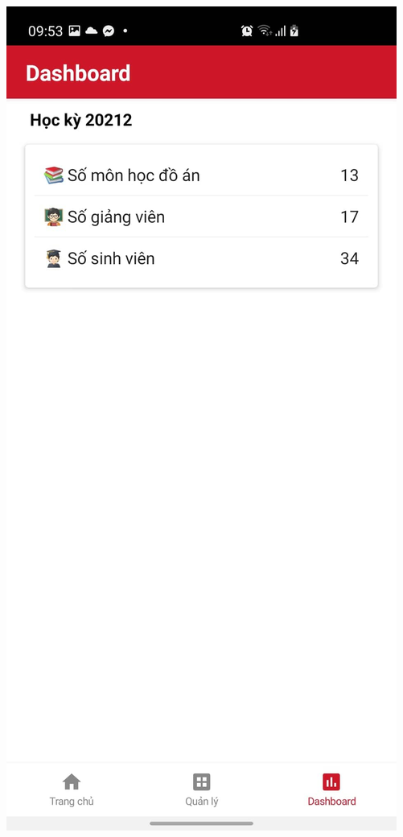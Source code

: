 \documentclass[../Main.tex]{subfiles}
\begin{document}
\begin{minipage}{0.5\textwidth}
\includegraphics[width=0.66\linewidth]{Figure/screen/dash_board.jpeg}
 \label{fig:star2}
\end{minipage}
\end{document}

